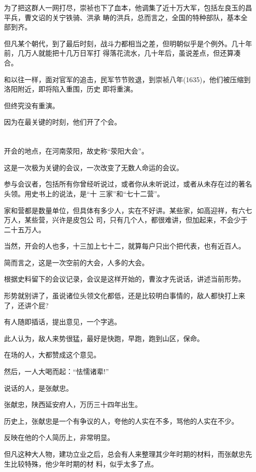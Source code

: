 \documentclass[11pt,a4paper,onecolumn]{article}
\begin{document}
为了把这群人一网打尽，崇祯也下了血本，他调集了近十万大军，包括左良玉的昌平兵，曹文诏的关宁铁骑、洪承
畴的洪兵，总而言之，全国的特种部队，基本全部到齐。

但凡某个朝代，到了最后时刻，战斗力都相当之差，但明朝似乎是个例外。几十年前，几万人就能把十几万日军打
得落花流水，几十年后，虽说差点，但还算凑合。

和以往一样，面对官军的追击，民军节节败退，到崇祯八年(1635)，他们被压缩到洛阳附近，即将陷入重围，历史
即将重演。

但终究没有重演。

因为在最关键的时刻，他们开了个会。

\section[\thesection]{}

开会的地点，在河南荥阳，故史称``荥阳大会''。

这是一次极为关键的会议，一次改变了无数人命运的会议。

参与会议者，包括所有你曾经听说过，或者你从未听说过，或者从未存在过的著名头领。用史书上的说法，是``十
三家''和``七十二营''。

家和营都是数量单位，但具体有多少人，实在不好讲。某些家，如高迎祥，有六七万人，某些营，兴许是皮包公
司，只有几个人，都很难讲，但加起来，不会少于二十五万人。

当然，开会的人也多，十三加上七十二，就算每户只出个把代表，也有近百人。

简而言之，这是一次空前的大会，人多的大会。

根据史料留下的会议记录，会议是这样开始的，曹汝才先说话，讲述当前形势。

形势就别讲了，虽说诸位头领文化都低，还是比较明白事情的，敌人都快打上来了，还讲个屁?

有人随即插话，提出意见，一个字\myrule 逃。

此人认为，敌人来势很猛，最好是快跑，早跑，跑到山区，保命。

在场的人，大都赞成这个意见。

然后，一人大喝而起：``怯懦诸辈!''

说话的人，是张献忠。

张献忠，陕西延安府人，万历三十四年出生。

历史上，张献忠是一个有争议的人，夸他的人实在不多，骂他的人实在不少。

反映在他的个人简历上，非常明显。

但凡这种大人物，建功立业之后，总会有人来整理其少年时期的材料，而张献忠先生比较特殊，他少年时期的材
料，似乎太多了点。
\end{document}
